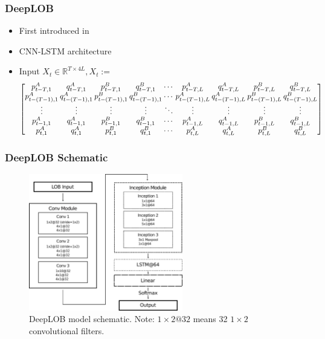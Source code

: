\documentclass[handout]{beamer}
\begin{document}
\begin{frame}
    \frametitle{DeepLOB}
     \begin{itemize}
         \item First introduced in {\color{blue}\cite{ZHANG2019}}
        \item CNN-LSTM architecture
        \item Input $X_t \in \mathbb{R}^{T \times 4L}, X_t :=$
            \tiny
        \begin{equation}
            \begingroup
            \setlength\arraycolsep{1pt}
            \begin{bmatrix}
            p_{t-T, 1}^A & q_{t-T, 1}^A & p_{t-T, 1}^B &  q_{t-T, 1}^B &  \cdots & p_{t-T, L}^A &  q_{t-T, L}^A & p_{t-T, L}^B & q_{t-T, L}^B\\
            p_{t-(T-1), 1}^A & q_{t-(T-1), 1}^A & p_{t-(T-1), 1}^B &  q_{t-(T-1), 1}^B &  \cdots & p_{t-(T-1), L}^A &  q_{t-(T-1), L}^A & p_{t-(T-1), L}^B & q_{t-(T-1), L}^B\\
            \vdots & \vdots & \vdots & \vdots & \ddots & \vdots & \vdots& \vdots & \vdots\\
            p_{t-1, 1}^A & q_{t-1, 1}^A & p_{t-1, 1}^B &  q_{t-1, 1}^B &  \cdots & p_{t-1, L}^A &  q_{t-1, L}^A & p_{t-1, L}^B & q_{t-1, L}^B\\
            p_{t, 1}^A & q_{t, 1}^A & p_{t, 1}^B &  q_{t, 1}^B &  \cdots & p_{t, L}^A &  q_{t, L}^A & p_{t, L}^B & q_{t, L}^B\\
            \end{bmatrix}
            \endgroup
        \end{equation}
    \end{itemize}
    
\end{frame}

\begin{frame}
    \frametitle{DeepLOB Schematic}
    \begin{figure}[htpb]
        \centering
        \includegraphics[width=0.6\textwidth]{./images/deepLOB_architecture.pdf}
        \caption{DeepLOB model schematic. Note: $1\times 2 @32$ means 32 $1 \times 2$ convolutional filters.}
    \end{figure}
\end{frame}
\end{document}
